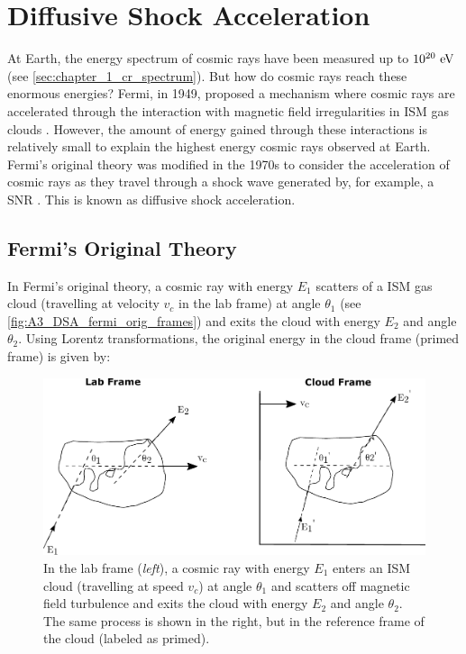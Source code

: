 \chapter{Diffusive Shock Acceleration} \label{A3_DSA}

At Earth, the energy spectrum of cosmic rays have been measured up to $10^{20}~\si{\electronvolt}$ (see \autoref{sec:chapter_1_cr_spectrum}). But how do cosmic rays reach these enormous energies? Fermi, in 1949, proposed a mechanism where cosmic rays are accelerated through the interaction with magnetic field irregularities in ISM gas clouds \citep{1949PhRv...75.1169F}. However, the amount of energy gained through these interactions is relatively small to explain the highest energy cosmic rays observed at Earth. Fermi's original theory was modified in the 1970s to consider the acceleration of cosmic rays as they travel through a shock wave generated by, for example, a SNR \citep{1977DoSSR.234.1306K,1977ICRC...11..132A,1978MNRAS.182..147B,1978MNRAS.182..443B,1978ApJ...221L..29B}. This is known as diffusive shock acceleration.

\section{Fermi's Original Theory}

In Fermi's original theory, a cosmic ray with energy $E_1$  scatters of a ISM gas cloud (travelling at velocity $v_c$ in the lab frame) at angle $\theta_1$ (see \autoref{fig:A3_DSA_fermi_orig_frames}) and exits the cloud with energy $E_2$ and angle $\theta_2$. Using Lorentz transformations, the original energy in the cloud frame (primed frame) is given by:

\begin{figure}[h!]
    \centering
    \includegraphics{A3_Diffusive_Shock_Acceleration/Images/fermi_original_theory_frames.pdf}
    \caption{In the lab frame (\textit{left}), a cosmic ray with energy $E_1$ enters an ISM cloud (travelling at speed $v_c$) at angle $\theta_1$ and scatters off magnetic field turbulence and exits the cloud with energy $E_2$ and angle $\theta_2$. The same process is shown in the right, but in the reference frame of the cloud (labeled as primed).}
    \label{fig:A3_DSA_fermi_orig_frames}
\end{figure}

